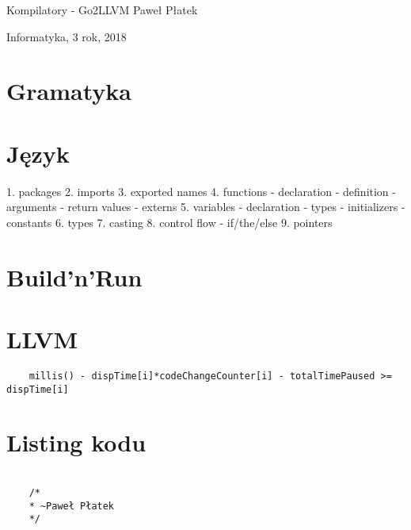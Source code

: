 \documentclass[a4paper,16pt]{article}
\begin{document}
	{\Large Kompilatory - Go2LLVM \hfill \hfill Paweł Płatek
		
		Informatyka, 3 rok, 2018}
	

	\section{Gramatyka}

    \section{Język}
    
    1. packages
    2. imports
    3. exported names
    4. functions
        - declaration
        - definition
        - arguments
        - return values
        - externs
    5. variables
        - declaration
        - types
        - initializers
        - constants
    6. types
    7. casting
    8. control flow
        - if/the/else
    9. pointers




    \section{Build'n'Run}

    \section{LLVM}


	
	
	\begin{lstlisting}
	millis() - dispTime[i]*codeChangeCounter[i] - totalTimePaused >= dispTime[i]
	\end{lstlisting}

	
	\section{Listing kodu}
	\begin{verbatim}
	
	/*
	* ~Paweł Płatek
	*/
	\end{verbatim}
	
\end{document}
